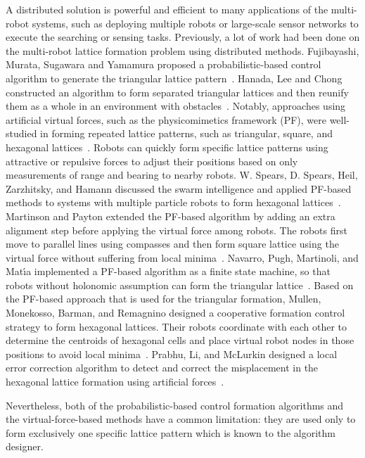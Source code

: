 A distributed solution is powerful and efficient to many applications of the multi-robot systems,
such as deploying multiple robots or large-scale sensor networks to execute the searching or sensing tasks. 
%
Previously, a lot of work had been done on the multi-robot lattice formation
problem using distributed methods. 
%
Fujibayashi, Murata, Sugawara and Yamamura proposed a probabilistic-based control algorithm to generate the triangular lattice pattern~\cite{FujMurSugYam02}. 
%
Hanada, Lee and Chong constructed an algorithm to form separated triangular lattices and then reunify
them as a whole in an environment with obstacles~\cite{HanLeeCho07}.  
%
Notably, approaches using artificial virtual forces, such as the physicomimetics framework (PF), 
were well-studied in forming repeated lattice patterns, such as
triangular, square, and hexagonal lattices~\cite{FujMurSugYam02, HanLeeCho07,
  SpeSpeHamHei04, SpeHeiZar05, MarPay2005, NavPugMarMat09, LeeBecFekKroMcL14,
  PraLiMcLu12, MulMonBarRem13}. 
%  
Robots can quickly form specific lattice patterns using attractive or repulsive forces to adjust their positions based on only measurements of range and bearing to nearby robots.  
%
W. Spears, D. Spears, Heil, Zarzhitsky, and Hamann discussed the swarm intelligence and applied PF-based
methods to systems with multiple particle robots to form hexagonal lattices~\cite{SpeSpeHamHei04}.  
%
Martinson and Payton extended the PF-based algorithm by adding an extra alignment step before applying the virtual force among robots.  
%
The robots first move to parallel lines using compasses and then form square lattice using 
the virtual force without suffering from local minima~\cite{MarPay2005}.  
%
Navarro, Pugh, Martinoli, and Mat{\'\i}a implemented a PF-based algorithm as a finite state machine, 
so that robots without holonomic assumption can form the triangular lattice~\cite{NavPugMarMat09}.  
%
Based on the PF-based approach that is used for the triangular formation, 
Mullen, Monekosso, Barman, and Remagnino designed a cooperative formation control strategy to form hexagonal lattices. 
%
Their robots coordinate with each other to determine the centroids of hexagonal cells and place
virtual robot nodes in those positions to avoid local minima~\cite{MulMonBarRem13}. 
%
Prabhu, Li, and McLurkin designed a local error correction algorithm to detect and correct the misplacement in the hexagonal lattice formation using artificial forces~\cite{PraLiMcLu12}.


Nevertheless, both of the probabilistic-based control formation algorithms 
and the virtual-force-based methods have a common limitation: 
they are used only to form exclusively one specific lattice
pattern which is known to the algorithm designer.


